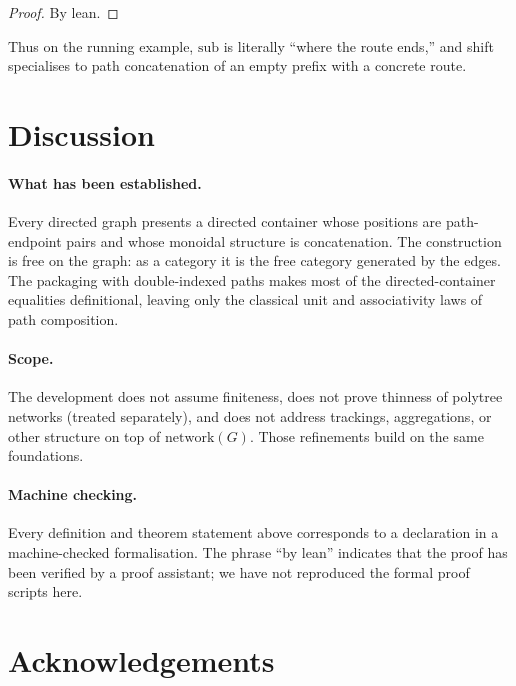 \documentclass[11pt,a4paper]{article}
\theoremstyle{plain}
\theoremstyle{definition}
\newcommand{\sub}{\mathrm{sub}}
\begin{document}
\begin{proof}
By lean.
\end{proof}

Thus on the running example, $\sub$ is literally ``where the route ends,'' and
shift specialises to path concatenation of an empty prefix with a concrete
route.

\section{Discussion}

\paragraph{What has been established.}
Every directed graph presents a directed container whose positions are
path-endpoint pairs and whose monoidal structure is concatenation. The
construction is free on the graph: as a category it is the free category
generated by the edges. The packaging with double-indexed paths makes most of
the directed-container equalities definitional, leaving only the classical unit
and associativity laws of path composition.

\paragraph{Scope.}
The development does not assume finiteness, does not prove thinness of polytree
networks (treated separately), and does not address trackings, aggregations, or
other structure on top of $\mathrm{network}(G)$. Those refinements build on the
same foundations.

\paragraph{Machine checking.}
Every definition and theorem statement above corresponds to a declaration in a
machine-checked formalisation. The phrase ``by lean'' indicates that the proof
has been verified by a proof assistant; we have not reproduced the formal
proof scripts here.

\section*{Acknowledgements}
\end{document}
